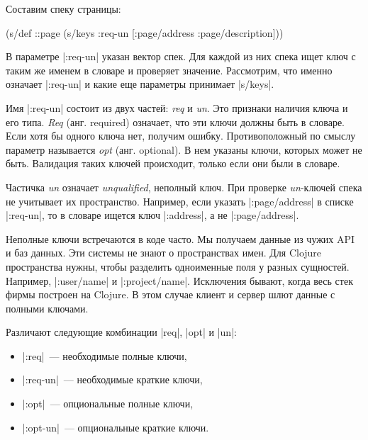 Составим спеку страницы:

\begin{english}
  \begin{clojure}
(s/def ::page
  (s/keys :req-un [:page/address
                   :page/description]))
  \end{clojure}
\end{english}

В параметре \spverb|:req-un| указан вектор спек. Для каждой из них спека ищет
ключ с таким же именем в словаре и проверяет значение. Рассмотрим, что именно
означает \spverb|:req-un| и какие еще параметры принимает \spverb|s/keys|.

Имя \spverb|:req-un| состоит из двух частей: \emph{req} и \emph{un}. Это
признаки наличия ключа и его типа. \emph{Req} (анг. required) означает, что эти
ключи должны быть в словаре. Если хотя бы одного ключа нет, получим
ошибку. Противоположный по смыслу параметр называется \emph{opt}
(анг. optional). В нем указаны ключи, которых может не быть. Валидация таких
ключей происходит, только если они были в словаре.

Частичка \emph{un} означает \emph{unqualified}, неполный ключ. При проверке
\emph{un}-ключей спека не учитывает их пространство. Например, если указать
\spverb|:page/address| в списке \spverb|:req-un|, то в словаре ищется ключ
\spverb|:address|, а не \spverb|:page/address|.

Неполные ключи встречаются в коде часто. Мы получаем данные из чужих API и баз
данных. Эти системы не знают о пространствах имен. Для Clojure пространства
нужны, чтобы разделить одноименные поля у разных сущностей. Например,
\spverb|:user/name| и \spverb|:project/name|. Исключения бывают, когда весь стек
фирмы построен на Clojure. В этом случае клиент и сервер шлют данные с полными
ключами.

Различают следующие комбинации \spverb|req|, \spverb|opt| и \spverb|un|:

\begin{itemize}

\item
  \spverb|:req|~--- необходимые полные ключи,

\item
  \spverb|:req-un|~--- необходимые краткие ключи,

\item
  \spverb|:opt|~--- опциональные полные ключи,

\item
  \spverb|:opt-un|~--- опциональные краткие ключи.

\end{itemize}

